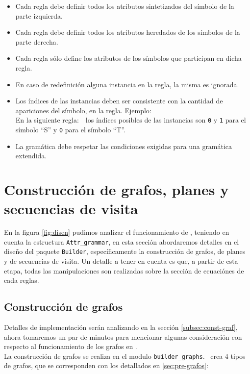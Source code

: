 \begin{description}
\begin{itemize}
\item Cada regla debe definir todos los atributos sintetizados del símbolo de la parte izquierda.
\item Cada regla debe definir todos los atributos heredados de los símbolos de la parte derecha.
\item Cada regla sólo define los atributos de los símbolos que participan en dicha regla.
\item En caso de redefinición alguna instancia en la regla, la misma es ignorada.
\item Los índices de las instancias deben ser consistente con la cantidad de apariciones del símbolo, en la regla. Ejemplo: \\En la siguiente regla:\ \ los índices posibles de las instancias son \texttt{0} y \texttt{1} para el símbolo ``S'' y \texttt{0} para el símbolo ``T''.
\item La gramática debe respetar las condiciones exigidas para una gramática extendida. 
\end{itemize}
\end{description}

\section{Construcción de grafos, planes y secuencias de visita}

En la figura \ref{fig:disen} pudimos analizar el funcionamiento de \maggen, teniendo en cuenta la estructura \texttt{Attr\_grammar}, en esta sección abordaremos detalles en el diseño del paquete \texttt{Builder}, específicamente la construcción de grafos, de planes y de secuencias de visita. Un detalle a tener en cuenta es que, a partir de esta etapa, todas las manipulaciones son realizadas sobre la sección de ecuaciónes de cada reglas.

\subsection*{Construcción de grafos}
\label{subsec:graph}

Detalles de implementación serán analizando en la sección \ref{subsec:const-graf}, ahora tomaremos un par de minutos para mencionar algunas consideración con respecto al funcionamiento de los grafos en \maggen.\\

La construcción de grafos se realiza en el modulo \texttt{builder\_graphs}. \maggen\ crea 4 tipos de grafos, que se corresponden con los detallados en \ref{sec:pre-grafos}:


